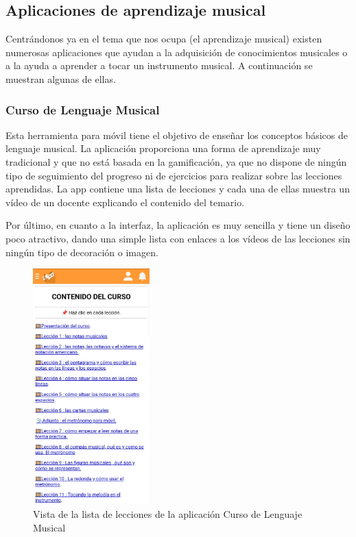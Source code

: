 \newpage


\subsection{Aplicaciones de aprendizaje musical}
Centrándonos ya en el tema que nos ocupa (el aprendizaje musical) existen numerosas aplicaciones que ayudan a la adquisición
de conocimientos musicales o a la ayuda a aprender a tocar un instrumento musical. A continuación se muestran algunas de ellas.


\subsubsection{Curso de Lenguaje Musical}
Esta herramienta para móvil tiene el objetivo de enseñar los conceptos básicos de lenguaje musical. La aplicación proporciona una forma de aprendizaje muy 
tradicional y que no está basada en la gamificación, ya que no dispone de ningún tipo de seguimiento del progreso ni de ejercicios para realizar sobre las lecciones aprendidas.
La app contiene una lista de lecciones y cada una de ellas muestra un vídeo de un docente explicando el contenido del temario. 

Por último, en cuanto a la interfaz, la aplicación es muy sencilla y tiene un diseño poco atractivo, dando una simple lista con enlaces
a los vídeos de las lecciones sin ningún tipo de decoración o imagen.

\begin{figure}[H]
    \centering
    \includegraphics[width=0.4\textwidth]{imagenes/c2/cursomusica.jpeg}
    \caption{Vista de la lista de lecciones de la aplicación Curso de Lenguaje Musical}
\end{figure}


